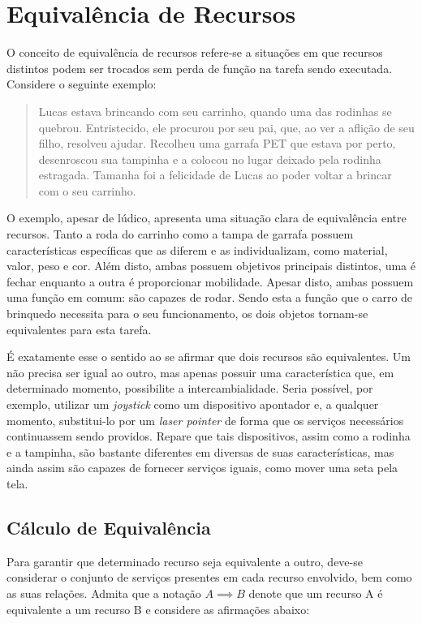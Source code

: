 \section{Equivalência de Recursos}
\label{sec:equivalenciaRecursos}

O conceito de equivalência de recursos refere-se a situações em que recursos distintos podem ser trocados sem perda de função na tarefa sendo executada. Considere o seguinte exemplo:

\begin{quote}
	Lucas estava brincando com seu carrinho, quando uma das rodinhas se quebrou. Entristecido, ele procurou por seu pai, que, ao ver a aflição de seu filho, resolveu ajudar. Recolheu uma garrafa PET que estava por perto, desenroscou sua tampinha e a colocou no lugar deixado pela rodinha estragada. Tamanha foi a felicidade de Lucas ao poder voltar a brincar com o seu carrinho.
\end{quote}

O exemplo, apesar de lúdico, apresenta uma situação clara de equivalência entre recursos. Tanto a roda do carrinho como a tampa de garrafa possuem características específicas que as diferem e as individualizam, como material, valor, peso e cor. Além disto, ambas possuem objetivos principais distintos, uma é fechar enquanto a outra é proporcionar mobilidade. Apesar disto, ambas possuem uma função em comum: são capazes de rodar. Sendo esta a função que o carro de brinquedo necessita para o seu funcionamento, os dois objetos tornam-se equivalentes para esta tarefa.

É exatamente esse o sentido ao se afirmar que dois recursos são equivalentes. Um não precisa ser igual ao outro, mas apenas possuir uma característica que, em determinado momento, possibilite a intercambialidade. Seria possível, por exemplo, utilizar um \emph{joystick} como um dispositivo apontador e, a qualquer momento, substitui-lo por um \emph{laser pointer} de forma que os serviços necessários continuassem sendo providos. Repare que tais dispositivos, assim como a rodinha e a tampinha, são bastante diferentes em diversas de suas características, mas ainda assim são capazes de fornecer serviços iguais, como mover uma seta pela tela.

\subsection{Cálculo de Equivalência}

Para garantir que determinado recurso seja equivalente a outro, deve-se considerar o conjunto de serviços presentes em cada recurso envolvido, bem como as suas relações. Admita que a notação $A \implies B$ denote que um recurso A é equivalente a um recurso B e considere as afirmações abaixo:

